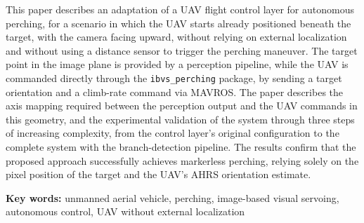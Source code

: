 \noindent\textbf{\imeprezime}

\noindent\textbf{\naslovradaEN}

\bigskip

\noindent This paper describes an adaptation of a UAV flight control layer for autonomous perching, for a scenario in which the UAV starts already positioned beneath the target, with the camera facing upward, without relying on external localization and without using a distance sensor to trigger the perching maneuver. The target point in the image plane is provided by a perception pipeline, while the UAV is commanded directly through the \texttt{ibvs\_perching} package, by sending a target orientation and a climb-rate command via MAVROS. The paper describes the axis mapping required between the perception output and the UAV commands in this geometry, and the experimental validation of the system through three steps of increasing complexity, from the control layer's original configuration to the complete system with the branch-detection pipeline. The results confirm that the proposed approach successfully achieves markerless perching, relying solely on the pixel position of the target and the UAV's AHRS orientation estimate.

\bigskip

\noindent\textbf{Key words:} unmanned aerial vehicle, perching, image-based visual servoing, autonomous control, UAV without external localization
